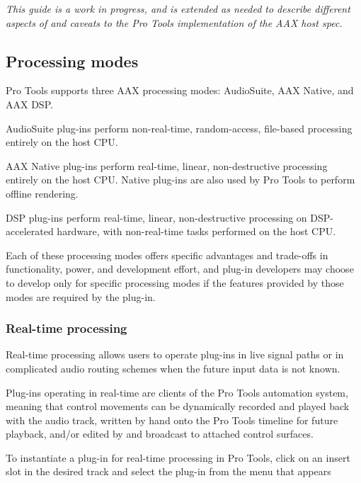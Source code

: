 {\itshape This guide is a work in progress, and is extended as needed to describe different aspects of and caveats to the Pro Tools implementation of the A\+A\+X host spec.} 

 \hypertarget{a00360_aax_pro_tools_guide_01_processing_modes}{}\subsection{Processing modes}\label{a00360_aax_pro_tools_guide_01_processing_modes}
Pro Tools supports three A\+A\+X processing modes\+: Audio\+Suite, A\+A\+X Native, and A\+A\+X D\+S\+P. 
\begin{DoxyItemize}
\item Audio\+Suite plug-\/ins perform non-\/real-\/time, random-\/access, file-\/based processing entirely on the host C\+P\+U.  
\item A\+A\+X Native plug-\/ins perform real-\/time, linear, non-\/destructive processing entirely on the host C\+P\+U. Native plug-\/ins are also used by Pro Tools to perform offline rendering.  
\item D\+S\+P plug-\/ins perform real-\/time, linear, non-\/destructive processing on D\+S\+P-\/accelerated hardware, with non-\/real-\/time tasks performed on the host C\+P\+U.  
\end{DoxyItemize}

Each of these processing modes offers specific advantages and trade-\/offs in functionality, power, and development effort, and plug-\/in developers may choose to develop only for specific processing modes if the features provided by those modes are required by the plug-\/in.

\hypertarget{a00360_subsection__realtime_processing}{}\subsubsection{Real-\/time processing}\label{a00360_subsection__realtime_processing}
 Real-\/time processing allows users to operate plug-\/ins in live signal paths or in complicated audio routing schemes when the future input data is not known.

Plug-\/ins operating in real-\/time are clients of the Pro Tools automation system, meaning that control movements can be dynamically recorded and played back with the audio track, written by hand onto the Pro Tools timeline for future playback, and/or edited by and broadcast to attached control surfaces.

To instantiate a plug-\/in for real-\/time processing in Pro Tools, click on an insert slot in the desired track and select the plug-\/in from the menu that appears

